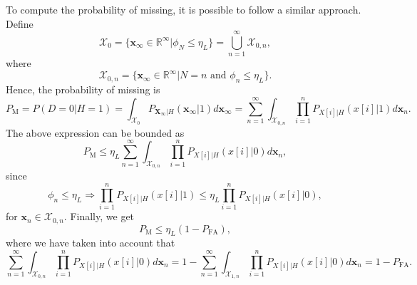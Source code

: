 To compute the probability of missing, it is possible to follow a similar approach. Define
\begin{equation*}
	\mathcal{X}_0 = \{ \mathbf{x}_{\infty} \in \mathbb{R}^{\infty} | \phi_{N} \leq  \eta_L  \} = \mathop{\bigcup}\limits_{n = 1}^{\infty} \mathcal{X}_{0,n},
\end{equation*}
where
\begin{equation*}
	\mathcal{X}_{0,n} = \{ \mathbf{x}_{\infty} \in \mathbb{R}^{\infty} |N = n \text{ and } \phi_{n} \leq  \eta_L  \}.
\end{equation*}
Hence, the probability of missing is
\begin{equation*}
	P_{\text{M}} = P(D = 0 | H = 1) = \int_{\mathcal{X}_0} P_{\mathbf{X}_{\infty} | H} (\mathbf{x}_{\infty} | 1) d \mathbf{x}_{\infty} = \sum_{n = 1}^{\infty}  \int_{\mathcal{X}_{0,n}} \prod_{i = 1}^{n} P_{X[i] | H}(x[i] | 1)  d \mathbf{x}_{n}.
\end{equation*}
The above expression can be bounded as
\begin{equation*}
	P_{\text{M}} \leq  \eta_L \sum_{n = 1}^{\infty}  \int_{\mathcal{X}_{0,n}}  \prod_{i = 1}^{n} P_{X[i] | H}(x[i] | 0)  d \mathbf{x}_{n},
\end{equation*}
since
\begin{equation*}
	\phi_n \leq \eta_L \Rightarrow   \prod_{i = 1}^{n} P_{X[i] | H}(x[i] | 1) \leq \eta_L \prod_{i = 1}^{n} P_{X[i] | H}(x[i] | 0),
\end{equation*}
for $\mathbf{x}_n \in \mathcal{X}_{0,n}$. Finally, we get
\begin{equation}
	\label{eq:bound_pm}
	P_{\text{M}} \leq  \eta_L (1 - P_{\text{FA}}),
\end{equation}
where we have taken into account that
\begin{equation*}
	\sum_{n = 1}^{\infty}  \int_{\mathcal{X}_{0,n}}  \prod_{i = 1}^{n} P_{X[i] | H}(x[i] | 0)  d \mathbf{x}_{n} = 1 - \sum_{n = 1}^{\infty}  \int_{\mathcal{X}_{1,n}}  \prod_{i = 1}^{n} P_{X[i] | H}(x[i] | 0)  d \mathbf{x}_{n} = 1 - P_{\text{FA}}.
\end{equation*}

